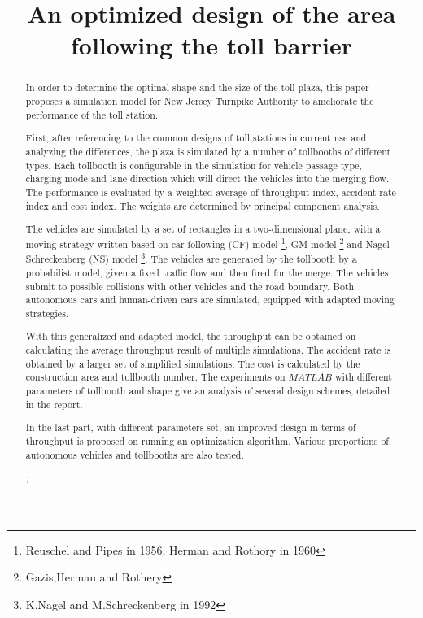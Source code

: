 \documentclass{mcmthesis}
\title{An optimized design of the area following the toll barrier }
\begin{document}
	
	
\begin{abstract}
	
In order to determine the optimal shape and the size of the toll plaza, this paper proposes a simulation model for New Jersey Turnpike Authority to ameliorate the performance of the toll station.

First, after referencing to the common designs of toll stations in current use and analyzing the differences, the plaza is simulated by a number of tollbooths of different types. Each tollbooth is configurable in the simulation for vehicle passage type, charging mode and lane direction which will direct the vehicles into the merging flow. The performance is evaluated by a weighted average of throughput index, accident rate index and cost index. The weights are determined by principal component analysis. 

The vehicles are simulated by a set of rectangles in a two-dimensional plane, with a moving strategy written based on car following (CF) model \footnote{Reuschel and Pipes in 1956, Herman and Rothory in 1960}, GM model \footnote{Gazis,Herman and Rothery} and Nagel-Schreckenberg (NS) model \footnote{K.Nagel and M.Schreckenberg in 1992}. The vehicles are generated by the tollbooth by a probabilist model, given a fixed traffic flow and then fired for the merge. The vehicles submit to possible collisions with other vehicles and the road boundary. Both autonomous cars and human-driven cars are simulated, equipped with adapted moving strategies.

With this generalized and adapted model, the throughput can be obtained on calculating the average throughput result of multiple simulations. The accident rate is obtained by a larger set of simplified simulations. The cost is calculated by the construction area and tollbooth number. The experiments on $MATLAB$ with different parameters of tollbooth and shape give an analysis of several design schemes, detailed in the report.

In the last part, with different parameters set, an improved design in terms of throughput is proposed on running an optimization algorithm. Various proportions of autonomous vehicles and tollbooths are also tested.


\begin{keywords}
;
\end{keywords}
\end{abstract}

\maketitle
\tableofcontents
\clearpage
\end{document}
